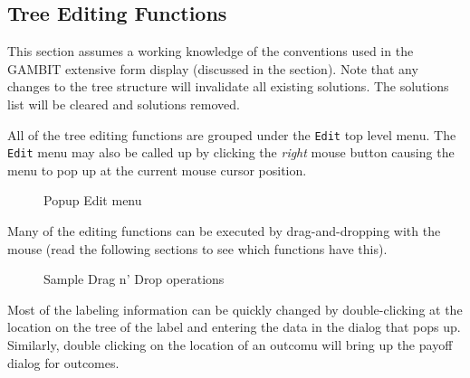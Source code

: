 {\subsection{Tree Editing Functions}
This section assumes a working knowledge of the conventions used in the
GAMBIT extensive form display (discussed in the 
 section). Note that any changes to
the tree structure will invalidate all existing solutions.  The solutions
list will be cleared and solutions removed.

All of the tree editing functions are grouped under the {\tt Edit} top
level menu.  The {\tt Edit} menu may also be called up by clicking the
{\em right} mouse button causing the menu to pop up at
the current mouse cursor position.

\begin{figure}
\caption{Popup Edit menu}
\end{figure}

Many of the editing functions can be executed
by drag-and-dropping with the mouse (read the following sections to see
which functions have this).

\begin{figure}
\caption{Sample Drag n' Drop operations}
\end{figure}

Most of the labeling information can be 
quickly changed by double-clicking at the location on the tree of the 
label and entering 
the data in the dialog that pops up.  Similarly, double clicking on 
the location of an outcomu will bring up the payoff dialog for outcomes.  

}
